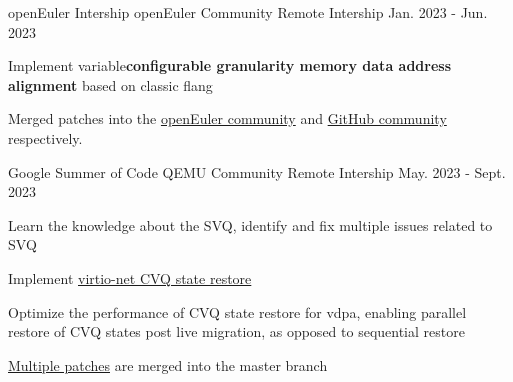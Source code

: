 \begin{cventries}
  \cventry
    {openEuler Intership} %
    {openEuler Community} %
    {Remote Intership} %
    {Jan. 2023 - Jun. 2023} %
    {
      \begin{cvitems} %
        \item {Implement variable\textbf{configurable granularity memory data address alignment} based on classic flang}
        \item {Merged patches into the \href{https://gitee.com/src-openeuler/flang/commits/master?user=yinjiawei2023}{\textcolor{awesome-skyblue}{openEuler community}} and \href{https://github.com/flang-compiler/flang/commit/7f17301a9715e229fc19242802e1bff953967d3e}{\textcolor{awesome-skyblue}{GitHub community}} respectively.}
      \end{cvitems}
    }

  \cventry
    {Google Summer of Code} %
    {QEMU Community} %
    {Remote Intership} %
    {May. 2023 - Sept. 2023} %
    {
      \begin{cvitems} %
        \item {Learn the knowledge about the SVQ, identify and fix multiple issues related to SVQ}
        \item {Implement \href{https://summerofcode.withgoogle.com/archive/2023/projects/zptoHp3v}{\textcolor{awesome-skyblue}{virtio-net CVQ state restore}}}
        \item {Optimize the performance of CVQ state restore for vdpa, enabling parallel restore of CVQ states post live migration, as opposed to sequential restore}
        \item {\href{https://gitlab.com/qemu-project/qemu/-/commits/master?search=Hawkins\%20Jiawei}{\textcolor{awesome-skyblue}{Multiple patches}} are merged into the master branch}
      \end{cvitems}
    }

\end{cventries}
